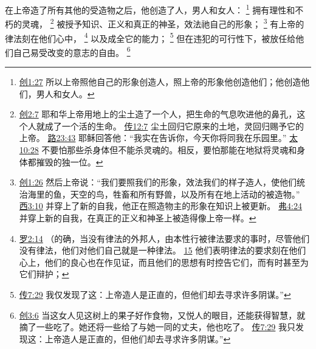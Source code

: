 \documentclass[12pt, a4paper, oneside]{ctexart}
\newcounter{parnum}[section]
\newcommand{\N}{%
   \noindent\refstepcounter{parnum}%
    \makebox[\parindent][l]{\textbf{\arabic{parnum}.}}}
\begin{document}
\N 在上帝造了所有其他的受造物之后，他创造了人，男人和女人：
	\footnote {
		\href{https://biblehub.com/genesis/1-27.htm}{创1:27} 所以上帝照他自己的形象创造人，照上帝的形象他创造他们；他创造他们，男人和女人。
	}
	拥有理性和不朽的灵魂，
	\footnote {
		\href{https://biblehub.com/genesis/2-7.htm}{创2:7} 耶和华上帝用地上的尘土造了一个人，把生命的气息吹进他的鼻孔，这个人就成了一个活的生命。
		\href{https://biblehub.com/ecclesiastes/12-7.htm}{传12:7} 尘土回归它原来的土地，灵回归赐予它的上帝。
		\href{https://biblehub.com/luke/23-43.htm}{路23:43} 耶稣回答他：“我实在告诉你，今天你将同我在乐园里。”
		\href{https://biblehub.com/matthew/10-28.htm}{太10:28} 不要怕那些杀身体但不能杀灵魂的。相反，要怕那能在地狱将灵魂和身体都摧毁的独一位。
	}
	被授予知识、正义和真正的神圣，效法祂自己的形象；
	\footnote {
		\href{https://biblehub.com/genesis/1-26.htm}{创1:26} 然后上帝说：“我们要照我们的形象，效法我们的样子造人，使他们统治海里的鱼，天空的鸟，牲畜和所有野兽，以及所有在地上活动的被造物。”
		\href{https://biblehub.com/colossians/3-10.htm}{西3:10} 并穿上了新的自我，他正在照造物主的形象在知识上被更新。
		\href{https://biblehub.com/ephesians/4-24.htm}{弗4:24} 并穿上新的自我，在真正的正义和神圣上被造得像上帝一样。
	}
	有上帝的律法刻在他们心中，
	\footnote {
		\href{https://biblehub.com/romans/2-14.htm}{罗2:14} （的确，当没有律法的外邦人，由本性行被律法要求的事时，尽管他们没有律法，他们对他们自己就是一种律法。
		\href{https://biblehub.com/romans/2-15.htm}{15} 他们表明律法的要求刻在他们心上，他们的良心也在作见证，而且他们的思想有时控告它们，而有时甚至为它们辩护；
	}
	以及成全它的能力；
	\footnote {
		\href{https://biblehub.com/ecclesiastes/7-29.htm}{传7:29} 我仅发现了这：上帝造人是正直的，但他们却去寻求许多阴谋。”
	}
	但在违犯的可行性下，被放任给他们自己易受改变的意志的自由。
	\footnote {
		\href{https://biblehub.com/genesis/3-6.htm}{创3:6} 当这女人见这树上的果子好作食物，又悦人的眼目，还能获得智慧，就摘了一些吃了。她还将一些给了与她一同的丈夫，他也吃了。
		\href{https://biblehub.com/ecclesiastes/7-29.htm}{传7:29} 我只发现这：上帝造人是正直的，但他们却去寻求许多阴谋。”
	}
\end{document}
